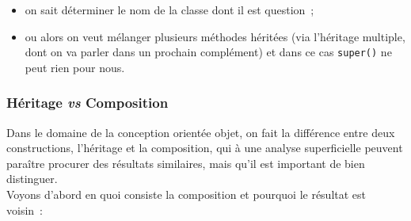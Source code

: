 \begin{itemize}
\tightlist
\item
  on sait déterminer le nom de la classe dont il est question~;
\item
  ou alors on veut mélanger plusieurs méthodes héritées (via l'héritage
  multiple, dont on va parler dans un prochain complément) et dans ce
  cas \texttt{super()} ne peut rien pour nous.
\end{itemize}

    \hypertarget{huxe9ritage-vs-composition}{%
\subsubsection{\texorpdfstring{Héritage \emph{vs}
Composition}{Héritage vs Composition}}\label{huxe9ritage-vs-composition}}

    Dans le domaine de la conception orientée objet, on fait la différence
entre deux constructions, l'héritage et la composition, qui à une
analyse superficielle peuvent paraître procurer des résultats
similaires, mais qu'il est important de bien distinguer.\\

Voyons d'abord en quoi consiste la composition et pourquoi le résultat
est voisin~:

